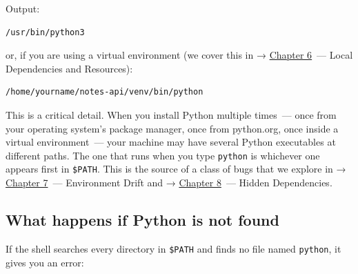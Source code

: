 \begin{codebox}[short]

\begin{Shaded}
\begin{Highlighting}[]
\end{Highlighting}
\end{Shaded}

\end{codebox}

\noindent{}Output:

\begin{outputbox}[short]
\begin{Verbatim}[fontsize=\codesize, breaklines, breakanywhere, breaksymbolleft={\tiny\textcolor{muted}{$\hookrightarrow$}}]
/usr/bin/python3
\end{Verbatim}
\end{outputbox}

\noindent{}or, if you are using a virtual environment (we cover this in → \hyperref[ch:06-local-dependencies]{Chapter 6}~--- Local Dependencies and Resources):

\begin{outputbox}[short]
\begin{Verbatim}[fontsize=\codesize, breaklines, breakanywhere, breaksymbolleft={\tiny\textcolor{muted}{$\hookrightarrow$}}]
/home/yourname/notes-api/venv/bin/python
\end{Verbatim}
\end{outputbox}

\noindent{}This is a critical detail. When you install Python multiple times~--- once from your operating system's package manager, once from python.org, once inside a virtual environment~--- your machine may have several Python executables at different paths. The one that runs when you type \texttt{python} is whichever one appears first in \texttt{\$PATH}. This is the source of a class of bugs that we explore in → \hyperref[ch:07-environment-drift]{Chapter 7}~--- Environment Drift and → \hyperref[ch:08-hidden-dependencies]{Chapter 8}~--- Hidden Dependencies.

\subsection*{What happens if Python is not found}\label{01-command-to-process:what-happens-if-python-is-not-found}

If the shell searches every directory in \texttt{\$PATH} and finds no file named \texttt{python}, it gives you an error:

